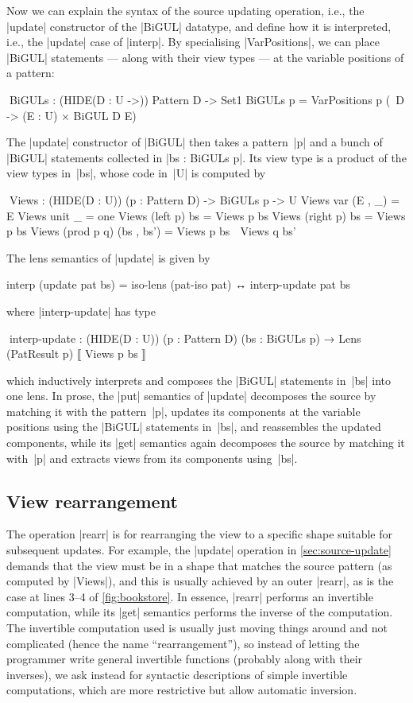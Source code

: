 \documentclass{sigplanconf}
\begin{document}
Now we can explain the syntax of the source updating operation, i.e., the |update| constructor of the |BiGUL| datatype, and define how it is interpreted, i.e., the |update| case of |interp|.
By specialising |VarPositions|, we can place |BiGUL| statements --- along with their view types --- at the variable positions of a pattern:
\begin{code}
^^^BiGULs : (HIDE({D : U} ->)) Pattern D -> Set1
BiGULs p = VarPositions p (\ D -> (E : U) × BiGUL D E)
\end{code}
The |update| constructor of |BiGUL| then takes a pattern~|p| and a bunch of |BiGUL| statements collected in |bs : BiGULs p|.
Its view type is a product of the view types in~|bs|, whose code in~|U| is computed by
\begin{code}
^^^Views : (HIDE({D : U})) (p : Pattern D) -> BiGULs p -> U
Views var         (E , _)     = E
Views unit        _           = one
Views (left   p)  bs          = Views p bs
Views (right  p)  bs          = Views p bs
Views (prod p q)  (bs , bs')  = Views p bs ⊗ Views q bs'
\end{code}
The lens semantics of |update| is given by
\begin{code}
interp (update pat bs) =
  iso-lens (pat-iso pat) ↔ interp-update pat bs
\end{code}
where |interp-update| has type
\begin{code}
^^^interp-update :  (HIDE({D : U})) (p : Pattern D) (bs : BiGULs p) →
                    Lens (PatResult p) ⟦ Views p bs ⟧
\end{code}
which inductively interprets and composes the |BiGUL| statements in~|bs| into one lens.
In prose, the |put| semantics of |update| decomposes the source by matching it with the pattern~|p|, updates its components at the variable positions using the |BiGUL| statements in~|bs|, and reassembles the updated components, while its |get| semantics again decomposes the source by matching it with~|p| and extracts views from its components using~|bs|.

\subsection{View rearrangement}
\label{sec:view-rearrangement}

The operation |rearr| is for rearranging the view to a specific shape suitable for subsequent updates.
For example, the |update| operation in \autoref{sec:source-update} demands that the view must be in a shape that matches the source pattern (as computed by |Views|), and this is usually achieved by an outer |rearr|, as is the case at lines 3--4 of \autoref{fig:bookstore}.
In essence, |rearr| performs an invertible computation, while its |get| semantics performs the inverse of the computation.
The invertible computation used is usually just moving things around and not complicated (hence the name ``rearrangement''), so instead of letting the programmer write general invertible functions (probably along with their inverses), we ask instead for syntactic descriptions of simple invertible computations, which are more restrictive but allow automatic inversion.
\end{document}
